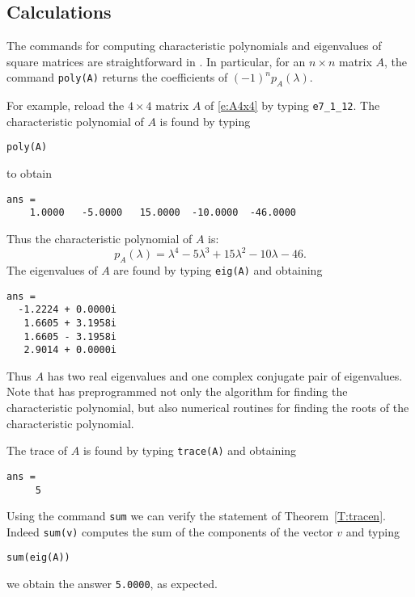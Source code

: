\documentclass{ximera}
\begin{document}
\subsection*{\Matlab Calculations}

The commands for computing characteristic polynomials and
eigenvalues of square matrices are straightforward in \Matlab.
In particular, for an $n\times n$ matrix $A$, the \Matlab command
 {\tt poly(A)} returns the coefficients of $(-1)^np_A(\lambda)$.

For example, reload the $4\times 4$ matrix $A$ of \eqref{e:A4x4}
by typing {\tt e7\_1\_12}.  The characteristic polynomial of $A$ is
found by typing
\begin{verbatim}
poly(A)
\end{verbatim} 
to obtain
\begin{verbatim}
ans =
    1.0000   -5.0000   15.0000  -10.0000  -46.0000
\end{verbatim} 
Thus the characteristic polynomial of $A$ is:
\[
p_A(\lambda) = \lambda^4 -5\lambda^3+15\lambda^2-10\lambda-46.
\]
The eigenvalues of $A$ are found by typing {\tt eig(A)} and
obtaining
\begin{verbatim}
ans =
  -1.2224 + 0.0000i
   1.6605 + 3.1958i
   1.6605 - 3.1958i
   2.9014 + 0.0000i
\end{verbatim}
Thus $A$ has two real eigenvalues and one complex conjugate pair
of eigenvalues.  Note that \Matlab has preprogrammed not only
the algorithm for finding the characteristic polynomial, but
also numerical routines for finding the roots of the
characteristic polynomial.

The trace of $A$ is found by typing {\tt trace(A)} and obtaining
\begin{verbatim} 
ans =
     5
\end{verbatim} 

Using the \Matlab command {\tt sum} we can verify the statement
of Theorem~\ref{T:tracen}.  Indeed {\tt sum(v)} computes the sum 
of the components of the vector $v$ and typing
\begin{verbatim}
sum(eig(A))
\end{verbatim}
we obtain the answer {\tt 5.0000}, as expected.



\end{document}
